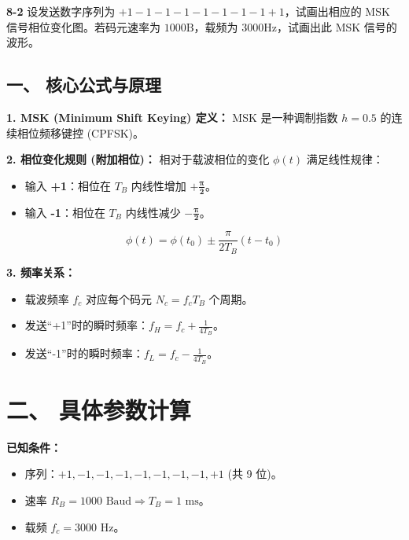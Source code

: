 \documentclass[a4paper,11pt]{ctexart}
\begin{document}
\noindent \textbf{8-2} 设发送数字序列为 $+1-1-1-1-1-1-1-1+1$，试画出相应的 MSK 信号相位变化图。若码元速率为 $1000\text{B}$，载频为 $3000\text{Hz}$，试画出此 MSK 信号的波形。
\begin{tcolorbox}[colback=white, colframe=blue!50!black, title=\textbf{题目解答：8-2 MSK 信号的相位与波形}]

    \section*{一、 核心公式与原理}
    
    \textbf{1. MSK (Minimum Shift Keying) 定义：}
    MSK 是一种调制指数 $h=0.5$ 的连续相位频移键控 (CPFSK)。
    
    \textbf{2. 相位变化规则 (附加相位)：}
    相对于载波相位的变化 $\phi(t)$ 满足线性规律：
    \begin{itemize}
        \item 输入 \textbf{+1}：相位在 $T_B$ 内线性增加 $\mathbf{+\frac{\pi}{2}}$。
        \item 输入 \textbf{-1}：相位在 $T_B$ 内线性减少 $\mathbf{-\frac{\pi}{2}}$。
    \end{itemize}
    \begin{equation}
        \phi(t) = \phi(t_0) \pm \frac{\pi}{2T_B}(t - t_0)
    \end{equation}
    
    \textbf{3. 频率关系：}
    \begin{itemize}
        \item 载波频率 $f_c$ 对应每个码元 $N_c = f_c T_B$ 个周期。
        \item 发送“+1”时的瞬时频率：$f_H = f_c + \frac{1}{4T_B}$。
        \item 发送“-1”时的瞬时频率：$f_L = f_c - \frac{1}{4T_B}$。
    \end{itemize}

    \end{tcolorbox}


    \section*{二、 具体参数计算}
    
    \textbf{已知条件：}
    \begin{itemize}
        \item 序列：$+1, -1, -1, -1, -1, -1, -1, -1, +1$ (共 9 位)。
        \item 速率 $R_B = 1000 \text{ Baud} \Rightarrow T_B = 1 \text{ ms}$。
        \item 载频 $f_c = 3000 \text{ Hz}$。
    \end{itemize}
    
\end{document}
